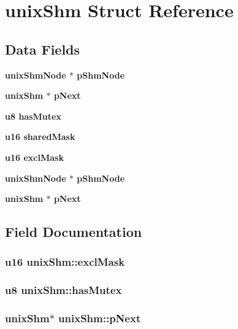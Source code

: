 \section{unix\-Shm Struct Reference}
\label{structunixShm}
\subsection*{Data Fields}
\begin{CompactItemize}
\item 
\bf{unix\-Shm\-Node} $\ast$ \bf{p\-Shm\-Node}
\item 
\bf{unix\-Shm} $\ast$ \bf{p\-Next}
\item 
\bf{u8} \bf{has\-Mutex}
\item 
\bf{u16} \bf{shared\-Mask}
\item 
\bf{u16} \bf{excl\-Mask}
\item 
\bf{unix\-Shm\-Node} $\ast$ \bf{p\-Shm\-Node}
\item 
\bf{unix\-Shm} $\ast$ \bf{p\-Next}
\end{CompactItemize}


\subsection{Field Documentation}
\subsubsection{\setlength{\rightskip}{0pt plus 5cm}\bf{u16} \bf{unix\-Shm::excl\-Mask}}\label{structunixShm_1a2d74a1ba99c7a6bfe4c2cf91d7d62f}


\subsubsection{\setlength{\rightskip}{0pt plus 5cm}\bf{u8} \bf{unix\-Shm::has\-Mutex}}\label{structunixShm_b375af64804df0d276fffe8db9438a0d}


\subsubsection{\setlength{\rightskip}{0pt plus 5cm}\bf{unix\-Shm}$\ast$ \bf{unix\-Shm::p\-Next}}\label{structunixShm_b54b7971df09bfa1e8a6ba8e324f5a16}


